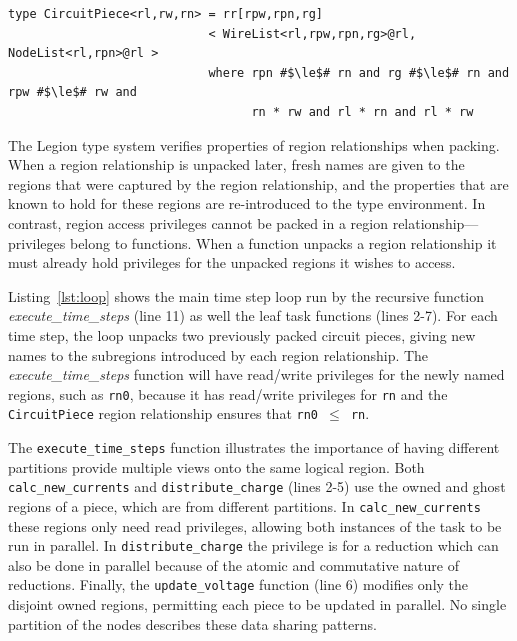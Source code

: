 \begin{lstlisting}[label={lst:rr},caption={Region Relationship Example}]
type CircuitPiece<rl,rw,rn> = rr[rpw,rpn,rg]
                            < WireList<rl,rpw,rpn,rg>@rl, NodeList<rl,rpn>@rl >         
                            where rpn #$\le$# rn and rg #$\le$# rn and rpw #$\le$# rw and
                                  rn * rw and rl * rn and rl * rw
\end{lstlisting}

The Legion type system verifies properties of region relationships when packing.  When
a region relationship is unpacked later, fresh names are given to the regions that were
captured by the region relationship, and the properties that are known to hold for these
regions are re-introduced to the type environment.
In contrast, region access privileges cannot be packed in a region
relationship---privileges belong to functions. When a function unpacks
a region relationship it must already hold privileges for the unpacked regions it wishes to access.

Listing~\ref{lst:loop} shows the main time step loop run by the 
recursive function {\em execute\_time\_steps} (line 11)
as well the leaf task functions (lines 2-7).  
For each time step, the loop unpacks 
two previously packed circuit pieces, giving new names to the subregions introduced
by each region relationship.  The {\em execute\_time\_steps} function
will have read/write privileges for the newly named regions, such as {\tt rn0},
because it has read/write privileges for {\tt rn} and the {\tt CircuitPiece} 
region relationship ensures that {\tt rn0 $\leq$ rn}.

The {\tt execute\_time\_steps} function   
illustrates the importance of having different partitions provide 
multiple views onto the same logical region.  Both {\tt calc\_new\_currents} 
and {\tt distribute\_charge} (lines 2-5)
use the owned and ghost regions of a piece, which are from different partitions. In
{\tt calc\_new\_currents} these regions only need read
privileges, allowing both instances of the task to be
run in parallel.  In {\tt distribute\_charge} the
privilege is for a reduction which can also be done in parallel
because of the atomic and commutative nature of reductions.  Finally,
the {\tt update\_voltage} function (line 6) modifies only the disjoint owned regions, 
permitting each piece to be updated in parallel.  No single partition of the nodes
describes these data sharing patterns.

